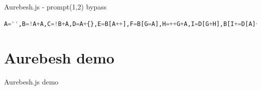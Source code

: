 \documentclass[aspectratio=169]{beamer}
\newcommand{\supertext}[1]{\fontsize{30}{40}\selectfont #1}
\begin{document}
\begin{frame}[fragile]{Aurebesh.js - prompt(1,2) bypass}
	\begin{lstlisting}[style=basicStyle, language=Python]
A='',B=!A+A,C=!B+A,D=A+{},E=B[A++],F=B[G=A],H=++G+A,I=D[G+H],B[I+=D[A]+(B.C+D)[A]+C[H]+E+F+B[G]+I+E+D[A]+F][I]('p'+F+D[A]+'m'+'p'+E+'(A,++A)')()
\end{lstlisting}
\end{frame}

\section*{Aurebesh demo}
\begin{frame}
	\centering
	\vfill
	\supertext{Aurebesh.js demo}
	\vfill
\end{frame}
\end{document}
